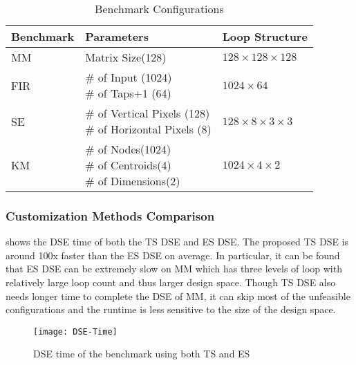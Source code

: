 \begin{table}[tb]
    \small
    \centering
    \caption{Benchmark Configurations \label{tab:benchmark-config}}{
        \begin{tabular}{l|l|l}
            \hline
            Benchmark & Parameters & Loop Structure \\ \hline
            MM & Matrix Size(128) & $128 \times 128 \times 128$ \\ \hline
            FIR & \tabincell{l}{\# of Input (1024) \\ \# of Taps+1 (64)} & $1024 \times 64$ \\ \hline
            SE & \tabincell{l}{ \# of Vertical Pixels (128) \\ \# of Horizontal Pixels (8)} & $128 \times 8 \times 3 \times 3$ \\ \hline 
            KM & \tabincell{l}{\# of Nodes(1024) \\ \# of Centroids(4) \\ \# of Dimensions(2)} & $1024 \times 4 \times 2$ \\ \hline  
        \end{tabular}
    }
\end{table}

\subsubsection{Customization Methods Comparison}
 shows the DSE time of both the TS DSE and ES DSE. 
The proposed TS DSE is around 100x faster than the ES DSE on 
average. In particular, it can be found that ES DSE can be 
extremely slow on MM which has three levels of loop with relatively large 
loop count and thus larger design space. Though TS DSE also needs 
longer time to complete the DSE of MM, it can skip most 
of the unfeasible configurations and the runtime is 
less sensitive to the size of the design space. 

\begin{figure}[tb]
    \centering
    \texttt{[image: DSE-Time]}
    \caption{DSE time of the benchmark using both TS and ES}
    \label{fig:DSE-Time}
\end{figure}


